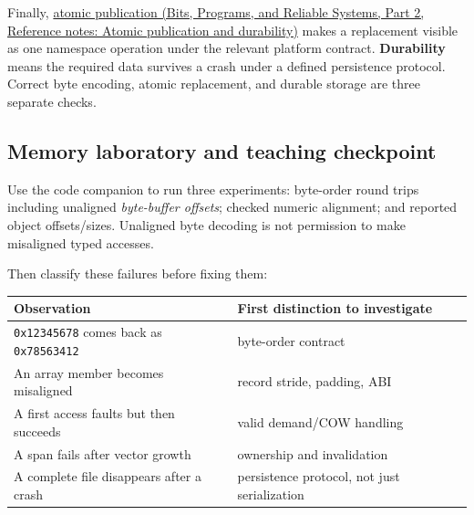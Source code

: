 Finally, \href{../01-Bits-Programs-and-Reliable-Systems-P02/main.pdf\#nameddest=appendix-e89a8f290ef5}{atomic publication (Bits, Programs, and Reliable Systems, Part 2, Reference notes: Atomic publication and durability)} makes a replacement visible as one namespace operation under the relevant platform contract. \textbf{Durability} means the required data survives a crash under a defined persistence protocol. Correct byte encoding, atomic replacement, and durable storage are three separate checks.

\subsection{Memory laboratory and teaching checkpoint}\label{05-engine-i-ch002-memory-laboratory-and-teaching-checkpoint}

\hypertarget{05-engine-i-ch002-memory-laboratory-and-teaching-checkpoint}{}

Use the code companion to run three experiments: byte-order round trips including unaligned \emph{byte-buffer offsets}; checked numeric alignment; and reported object offsets/sizes. Unaligned byte decoding is not permission to make misaligned typed accesses.

Then classify these failures before fixing them:

{\def\LTcaptype{none} %
\begin{longtable}[]{@{}
  >{\raggedright\arraybackslash}p{}
  >{\raggedright\arraybackslash}p{}@{}}
\toprule\noalign{}
\begin{minipage}[b]{\linewidth}\raggedright
Observation
\end{minipage} & \begin{minipage}[b]{\linewidth}\raggedright
First distinction to investigate
\end{minipage} \\
\midrule\noalign{}
\endhead
\bottomrule\noalign{}
\endlastfoot
\texttt{0x12345678} comes back as \texttt{0x78563412} & byte-order contract \\
An array member becomes misaligned & record stride, padding, ABI \\
A first access faults but then succeeds & valid demand/COW handling \\
A span fails after vector growth & ownership and invalidation \\
A complete file disappears after a crash & persistence protocol, not just serialization \\
\end{longtable}
}

